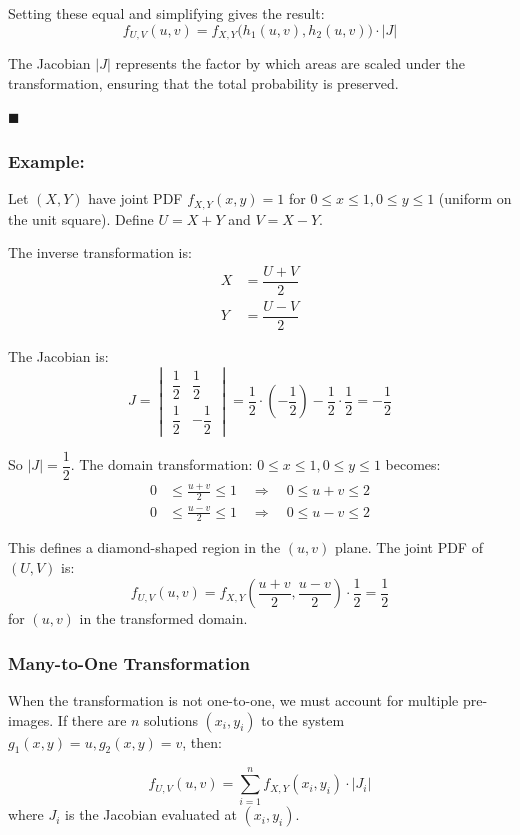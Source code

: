 \documentclass[twoside]{book}
\begin{document}
Setting these equal and simplifying gives the result:
\[
f_{U,V}(u,v) = f_{X,Y}\big(h_1(u,v), h_2(u,v)\big) \cdot |J|
\]

The Jacobian $|J|$ represents the factor by which areas are scaled under the transformation, ensuring that the total probability is preserved.

\hfill$\blacksquare$


\subsubsection{Example:}
Let $(X,Y)$ have joint PDF $f_{X,Y}(x,y) = 1$ for $0 \leq x \leq 1, 0 \leq y \leq 1$ (uniform on the unit square). Define $U = X + Y$ and $V = X - Y$.

The inverse transformation is:
\begin{align*}
X &= \dfrac{U + V}{2} \\
Y &= \dfrac{U - V}{2}
\end{align*}

The Jacobian is:
\[
J = \begin{vmatrix}
\dfrac{1}{2} & \dfrac{1}{2} \\[0.6em]
\dfrac{1}{2} & -\dfrac{1}{2}
\end{vmatrix} = \dfrac{1}{2} \cdot \left(-\dfrac{1}{2}\right) - \dfrac{1}{2} \cdot \dfrac{1}{2} = -\dfrac{1}{2}
\]

So $|J| = \dfrac{1}{2}$. The domain transformation: $0 \leq x \leq 1, 0 \leq y \leq 1$ becomes:
\begin{align*}
0 &\leq \frac{u+v}{2} \leq 1 \quad \Rightarrow \quad 0 \leq u+v \leq 2 \\
0 &\leq \frac{u-v}{2} \leq 1 \quad \Rightarrow \quad 0 \leq u-v \leq 2
\end{align*}

This defines a diamond-shaped region in the $(u,v)$ plane. The joint PDF of $(U,V)$ is:
\[
f_{U,V}(u,v) = f_{X,Y}\left(\frac{u+v}{2}, \frac{u-v}{2}\right) \cdot \frac{1}{2} = \frac{1}{2}
\]
for $(u,v)$ in the transformed domain.


\subsubsection*{Many-to-One Transformation}

When the transformation is not one-to-one, we must account for multiple pre-images. If there are $n$ solutions $(x_i, y_i)$ to the system $g_1(x,y) = u, g_2(x,y) = v$, then:

\begin{textbox}
\[
f_{U,V}(u,v) = \sum_{i=1}^{n} f_{X,Y}(x_i, y_i) \cdot |J_i|
\]
where $J_i$ is the Jacobian evaluated at $(x_i, y_i)$.
\end{textbox}
\end{document}
